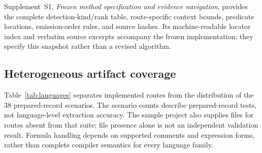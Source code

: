 \documentclass[a4paper,fleqn]{cas-dc}
\begin{document}
Supplement~S1, \emph{Frozen method specification and evidence navigation}, provides the complete detection-kind/rank table, route-specific context bounds, predicate locations, emission-order rules, and source hashes. Its machine-readable locator index and verbatim source excerpts accompany the frozen implementation; they specify this snapshot rather than a revised algorithm.

\subsection{Heterogeneous artifact coverage}

Table~\ref{tab:languages} separates implemented routes from the distribution of the 38 prepared-record scenarios. The scenario counts describe prepared-record tests, not language-level extraction accuracy. The sample project also supplies files for routes absent from that suite; file presence alone is not an independent validation result. Formula handling depends on supported comments and expression forms, rather than complete compiler semantics for every language family.
\end{document}
